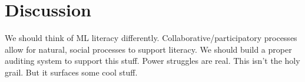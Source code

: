 \documentclass{sigchi-ext}
\begin{document}
\section{Discussion}
We should think of ML literacy differently.  Collaborative/participatory processes allow for natural, social processes to support literacy.
We should build a proper auditing system to support this stuff.
Power struggles are real.  This isn't the holy grail.  But it surfaces some cool stuff.

\balance{}



\end{document}
